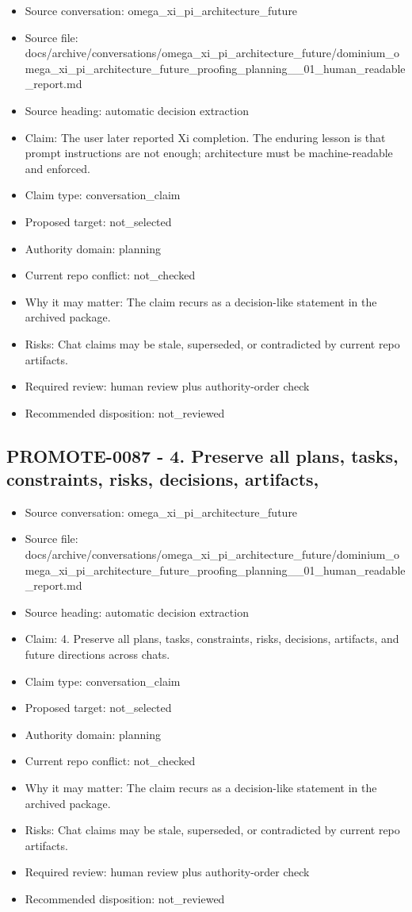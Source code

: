 \documentclass[11pt,a4paper]{report}
\begin{document}
\begin{itemize}
\item Source conversation: omega\_xi\_pi\_architecture\_future
\item Source file: docs/archive/conversations/omega\_xi\_pi\_architecture\_future/dominium\_omega\_xi\_pi\_architecture\_future\_proofing\_planning\_\_01\_human\_readable\_report.md
\item Source heading: automatic decision extraction
\item Claim: The user later reported Xi completion. The enduring lesson is that prompt instructions are not enough; architecture must be machine-readable and enforced.
\item Claim type: conversation\_claim
\item Proposed target: not\_selected
\item Authority domain: planning
\item Current repo conflict: not\_checked
\item Why it may matter: The claim recurs as a decision-like statement in the archived package.
\item Risks: Chat claims may be stale, superseded, or contradicted by current repo artifacts.
\item Required review: human review plus authority-order check
\item Recommended disposition: not\_reviewed
\end{itemize}

\subsection{PROMOTE-0087 - 4. Preserve all plans, tasks, constraints, risks, decisions, artifacts,}

\begin{itemize}
\item Source conversation: omega\_xi\_pi\_architecture\_future
\item Source file: docs/archive/conversations/omega\_xi\_pi\_architecture\_future/dominium\_omega\_xi\_pi\_architecture\_future\_proofing\_planning\_\_01\_human\_readable\_report.md
\item Source heading: automatic decision extraction
\item Claim: 4. Preserve all plans, tasks, constraints, risks, decisions, artifacts, and future directions across chats.
\item Claim type: conversation\_claim
\item Proposed target: not\_selected
\item Authority domain: planning
\item Current repo conflict: not\_checked
\item Why it may matter: The claim recurs as a decision-like statement in the archived package.
\item Risks: Chat claims may be stale, superseded, or contradicted by current repo artifacts.
\item Required review: human review plus authority-order check
\item Recommended disposition: not\_reviewed
\end{itemize}
\end{document}

